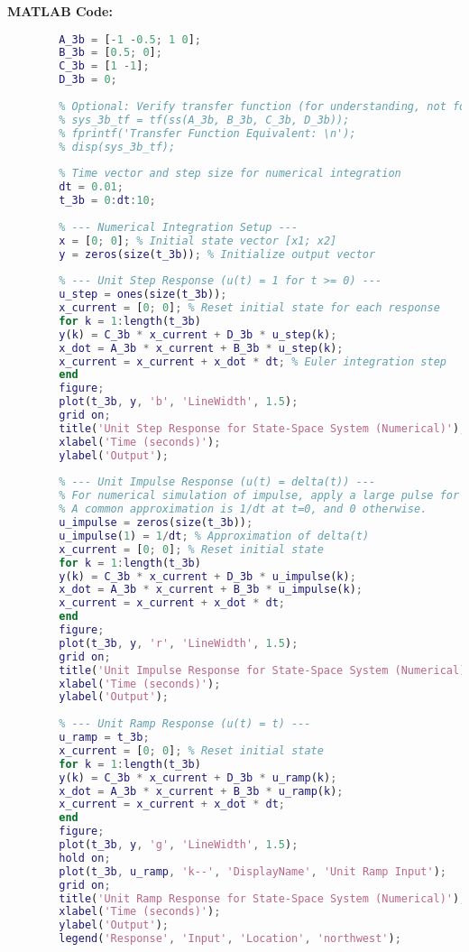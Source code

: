 \documentclass{article}
\begin{document}
	\textbf{MATLAB Code:}
	\begin{lstlisting}[language=Matlab, caption=MATLAB Code for Problem 3(b) (Numerical Integration for State-Space)]
		% Define state-space matrices
		A_3b = [-1 -0.5; 1 0];
		B_3b = [0.5; 0];
		C_3b = [1 -1];
		D_3b = 0;
		
		% Optional: Verify transfer function (for understanding, not for use in plotting)
		% sys_3b_tf = tf(ss(A_3b, B_3b, C_3b, D_3b));
		% fprintf('Transfer Function Equivalent: \n');
		% disp(sys_3b_tf);
		
		% Time vector and step size for numerical integration
		dt = 0.01;
		t_3b = 0:dt:10;
		
		% --- Numerical Integration Setup ---
		x = [0; 0]; % Initial state vector [x1; x2]
		y = zeros(size(t_3b)); % Initialize output vector
		
		% --- Unit Step Response (u(t) = 1 for t >= 0) ---
		u_step = ones(size(t_3b));
		x_current = [0; 0]; % Reset initial state for each response
		for k = 1:length(t_3b)
		y(k) = C_3b * x_current + D_3b * u_step(k);
		x_dot = A_3b * x_current + B_3b * u_step(k);
		x_current = x_current + x_dot * dt; % Euler integration step
		end
		figure;
		plot(t_3b, y, 'b', 'LineWidth', 1.5);
		grid on;
		title('Unit Step Response for State-Space System (Numerical)');
		xlabel('Time (seconds)');
		ylabel('Output');
		
		% --- Unit Impulse Response (u(t) = delta(t)) ---
		% For numerical simulation of impulse, apply a large pulse for a very short duration.
		% A common approximation is 1/dt at t=0, and 0 otherwise.
		u_impulse = zeros(size(t_3b));
		u_impulse(1) = 1/dt; % Approximation of delta(t)
		x_current = [0; 0]; % Reset initial state
		for k = 1:length(t_3b)
		y(k) = C_3b * x_current + D_3b * u_impulse(k);
		x_dot = A_3b * x_current + B_3b * u_impulse(k);
		x_current = x_current + x_dot * dt;
		end
		figure;
		plot(t_3b, y, 'r', 'LineWidth', 1.5);
		grid on;
		title('Unit Impulse Response for State-Space System (Numerical)');
		xlabel('Time (seconds)');
		ylabel('Output');
		
		% --- Unit Ramp Response (u(t) = t) ---
		u_ramp = t_3b;
		x_current = [0; 0]; % Reset initial state
		for k = 1:length(t_3b)
		y(k) = C_3b * x_current + D_3b * u_ramp(k);
		x_dot = A_3b * x_current + B_3b * u_ramp(k);
		x_current = x_current + x_dot * dt;
		end
		figure;
		plot(t_3b, y, 'g', 'LineWidth', 1.5);
		hold on;
		plot(t_3b, u_ramp, 'k--', 'DisplayName', 'Unit Ramp Input');
		grid on;
		title('Unit Ramp Response for State-Space System (Numerical)');
		xlabel('Time (seconds)');
		ylabel('Output');
		legend('Response', 'Input', 'Location', 'northwest');
		

\end{lstlisting}
\end{document}
